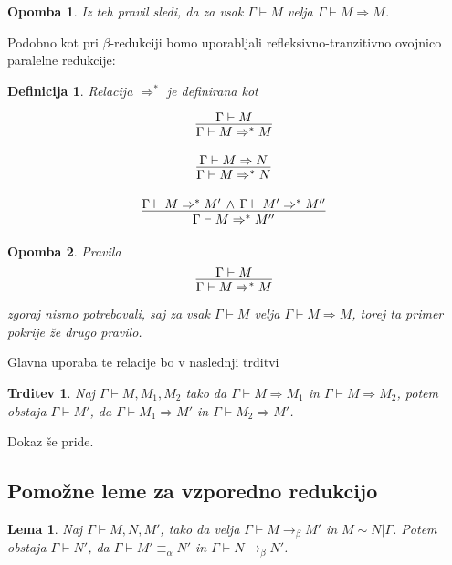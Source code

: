 \documentclass{article}
\newcommand{\inference}[3][]{\infer[#1]{#3}{#2}}
\newtheorem{trditev}{Trditev}
\newtheorem{lema}{Lema}
\newtheorem{opomba}{Opomba}
\newtheorem{definicija}{Definicija}
\begin{document}
\begin{opomba}
    Iz teh pravil sledi, da za vsak \(\Gamma \vdash M\) velja \(\Gamma \vdash M \Rightarrow M\).
\end{opomba}


Podobno kot pri \(\beta\)-redukciji bomo uporabljali refleksivno-tranzitivno ovojnico paralelne redukcije:

\begin{definicija}
    Relacija \(\Rightarrow^*\) je definirana kot

    \[
    \inference{\Gamma \vdash M}{\Gamma \vdash M \Rightarrow^* M}
    \]

    \[
    \inference{\Gamma \vdash M \Rightarrow N}{\Gamma \vdash M \Rightarrow^* N}
    \]

    \[
    \inference{\Gamma \vdash M \Rightarrow^* M'\, \wedge\, \Gamma \vdash M' \Rightarrow^* M''}{\Gamma \vdash M \Rightarrow^* M''}
    \]
\end{definicija}

\begin{opomba}
    Pravila 
    \[
    \inference{\Gamma \vdash M}{\Gamma \vdash M \Rightarrow^* M}
    \]
    zgoraj nismo potrebovali, saj za vsak \(\Gamma \vdash M\) velja \(\Gamma \vdash M \Rightarrow M\), torej ta primer pokrije že drugo pravilo.
\end{opomba}


Glavna uporaba te relacije bo v naslednji trditvi

\begin{trditev}
    Naj \(\Gamma \vdash M, M_1, M_2\) tako da \(\Gamma \vdash M \Rightarrow M_1\) in \(\Gamma \vdash M \Rightarrow M_2\), potem obstaja \(\Gamma \vdash M'\), da \(\Gamma \vdash M_1 \Rightarrow M'\) in \(\Gamma \vdash M_2 \Rightarrow M'\).
\end{trditev}

Dokaz še pride.

\subsection{Pomožne leme za vzporedno redukcijo}

\begin{lema}
    Naj \(\Gamma \vdash M, N, M'\), tako da velja \(\Gamma \vdash M \rightarrow_\beta M'\) in \(M \sim N | \Gamma\). Potem obstaja \(\Gamma \vdash N'\), da \(\Gamma \vdash M' \equiv_\alpha N'\) in \(\Gamma \vdash N \rightarrow_\beta N'\).
\end{lema}
\end{document}
